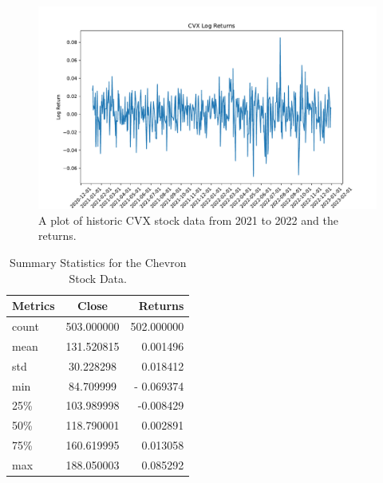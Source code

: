 \documentclass[12pt, letterpaper, titlepage]{article}
\newcommand{\jy}[1]{\textcolor{blue}{JY: #1}}
\begin{document}
\begin{figure}[tbp]
  \begin{center}
  \includegraphics[width=\textwidth]{../figures/fig2.pdf}
  \caption{A plot of historic CVX stock data from 2021 to 2022 and the returns.}\label{fig:returns}
  \end{center}
\end{figure}




\begin{table}[tbp]
  \begin{center}
    \caption{Summary Statistics for the Chevron Stock Data.}
    \label{tab:sumstat}
    \begin{tabular}{lcr} %
      \toprule
      {Metrics} & {Close} & {Returns}\\
      \midrule
      count & 503.000000 & 502.000000\\
      mean & 131.520815 & 0.001496\\
      std & 30.228298 & 0.018412\\
      min & 84.709999	 & - 0.069374\\
      25\% & 103.989998 & -0.008429\\
      50\% & 118.790001 & 0.002891\\
      75\% & 160.619995 & 0.013058\\
      max & 188.050003 & 0.085292\\
      \bottomrule
    \end{tabular}
  \end{center}
\end{table}
\end{document}
